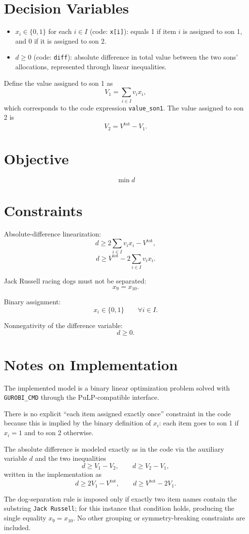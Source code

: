 \section*{Decision Variables}

\begin{itemize}
    \item $x_i \in \{0,1\}$ for each $i \in I$ (code: \texttt{x[i]}): equals 1 if item $i$ is assigned to son 1, and 0 if it is assigned to son 2.
    \item $d \ge 0$ (code: \texttt{diff}): absolute difference in total value between the two sons' allocations, represented through linear inequalities.
\end{itemize}

Define the value assigned to son 1 as
\[
V_1 = \sum_{i \in I} v_i x_i,
\]
which corresponds to the code expression \texttt{value\_son1}. The value assigned to son 2 is
\[
V_2 = V^{\text{tot}} - V_1.
\]

\section*{Objective}

\[
\min d
\]

\section*{Constraints}

Absolute-difference linearization:
\[
d \ge 2\sum_{i \in I} v_i x_i - V^{\text{tot}},
\]
\[
d \ge V^{\text{tot}} - 2\sum_{i \in I} v_i x_i.
\]

Jack Russell racing dogs must not be separated:
\[
x_9 = x_{10}.
\]

Binary assignment:
\[
x_i \in \{0,1\} \qquad \forall i \in I.
\]

Nonnegativity of the difference variable:
\[
d \ge 0.
\]

\section*{Notes on Implementation}

The implemented model is a binary linear optimization problem solved with \texttt{GUROBI\_CMD} through the PuLP-compatible interface.

There is no explicit ``each item assigned exactly once'' constraint in the code because this is implied by the binary definition of $x_i$: each item goes to son 1 if $x_i=1$ and to son 2 otherwise.

The absolute difference is modeled exactly as in the code via the auxiliary variable $d$ and the two inequalities
\[
d \ge V_1 - V_2,\qquad d \ge V_2 - V_1,
\]
written in the implementation as
\[
d \ge 2V_1 - V^{\text{tot}},\qquad d \ge V^{\text{tot}} - 2V_1.
\]

The dog-separation rule is imposed only if exactly two item names contain the substring \texttt{Jack Russell}; for this instance that condition holds, producing the single equality $x_9=x_{10}$. No other grouping or symmetry-breaking constraints are included.
